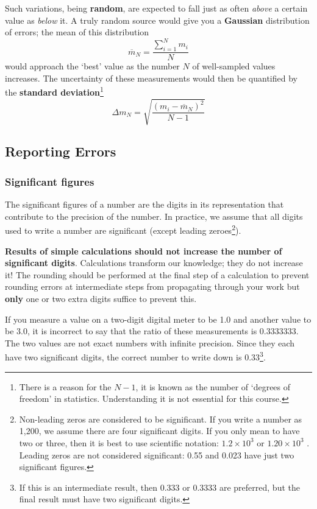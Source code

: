 Such variations, being \textbf{random}, are expected to fall just as often \textit{above} a certain value as \textit{below} it. A truly random source would give you a \textbf{Gaussian} distribution of errors; the mean of this distribution $$\overline{m}_N = \frac{\sum_{i=1}^{N}{m_i}}{N}$$ would approach the `best' value as the number $N$ of well-sampled values increases. The uncertainty of these measurements would then be quantified by the \textbf{standard deviation}\footnote{There is a reason for the $N-1$, it is known as the number of `degrees of freedom' in statistics. Understanding it is not essential for this course.} $$\Delta m_N = \sqrt{\frac{(m_i - \overline{m}_N)^2}{N-1}}$$

\subsection{Reporting Errors}
\subsubsection{Significant figures}

The significant figures of a number are the digits in its representation that contribute to the precision of the number. In practice, we assume that all digits used to write a number are significant (except leading zeroes\footnote{Non-leading zeros are considered to be significant. If you write a number as 1,200, we assume there are four significant digits. If you only mean to have two or three, then it is best to use scientific notation: $1.2 \times 10^3$ or $1.20 \times 10^3$ . Leading zeros are not considered significant: 0.55 and 0.023 have just two significant figures.}).

\textbf{Results of simple calculations should not increase the number of significant digits}. Calculations transform our knowledge; they do not increase it! The rounding should be performed at the final step of a calculation to prevent rounding errors at intermediate steps from propagating through your work but \textbf{only} one or two
extra digits suffice to prevent this.

If you measure a value on a two-digit digital meter to be 1.0 and another value to be 3.0, it is incorrect to say that the ratio of these measurements is 0.3333333. The two values are not exact numbers with infinite precision. Since they each have two significant digits, the correct number to write down is 0.33\footnote{If this is an intermediate result, then 0.333 or 0.3333 are preferred, but the final result must have two significant digits.}.

